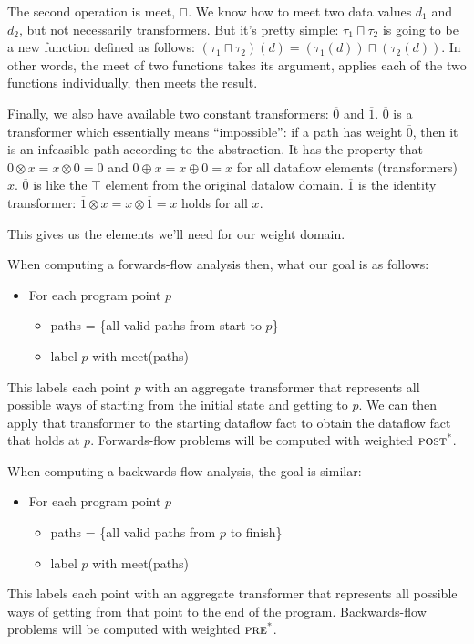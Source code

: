 \documentclass{article}
\newcommand{\meet}{\sqcap}
\newcommand{\extend}{\otimes}
\newcommand{\combine}{\oplus}
\newcommand{\poststar}{\ensuremath{\textsc{post}^\textsc{*}}}
\newcommand{\prestar}{\ensuremath{\textsc{pre}^\textsc{*}}}
\newcommand{\Zero}{\ensuremath{\overline{0}}}
\newcommand{\One}{\ensuremath{\overline{1}}}
\begin{document}
The second operation is meet, $\meet$. We know how to meet two data
values $d_1$ and $d_2$, but not necessarily transformers. But it's
pretty simple: $\tau_1 \meet \tau_2$ is going to be a new function
defined as follows: $(\tau_1 \meet \tau_2)(d) = (\tau_1(d)) \meet
(\tau_2(d))$. In other words, the meet of two functions takes its
argument, applies each of the two functions individually, then meets
the result.

Finally, we also have available two constant transformers: $\Zero$ and
$\One$. $\Zero$ is a transformer which essentially means
``impossible'': if a path has weight $\Zero$, then it is an infeasible
path according to the abstraction. It has the property that $\Zero
\extend x = x \extend \Zero = \Zero$ and $\Zero \combine x = x
\combine \Zero = x$ for all dataflow elements (transformers)
$x$. $\Zero$ is like the $\top$ element from the original datalow
domain. $\One$ is the identity transformer: $\One \extend x = x
\extend \One = x$ holds for all $x$.

This gives us the elements we'll need for our weight domain. 

When computing a forwards-flow analysis then, what our goal is as
follows:
\begin{itemize}
\item For each program point $p$
  \begin{itemize}
    \item paths = \{all valid paths from start to $p$\}
    \item label $p$ with meet(paths)
  \end{itemize}
\end{itemize}
This labels each point $p$ with an aggregate transformer that
represents all possible ways of starting from the initial state and
getting to $p$. We can then apply that transformer to the starting
dataflow fact to obtain the dataflow fact that holds at
$p$. Forwards-flow problems will be computed with weighted \poststar.

When computing a backwards flow analysis, the goal is similar:
\begin{itemize}
\item For each program point $p$
  \begin{itemize}
    \item paths = \{all valid paths from $p$ to finish\}
    \item label $p$ with meet(paths)
  \end{itemize}
\end{itemize}
This labels each point with an aggregate transformer that represents
all possible ways of getting from that point to the end of the
program. Backwards-flow problems will be computed with weighted
\prestar.
\end{document}
